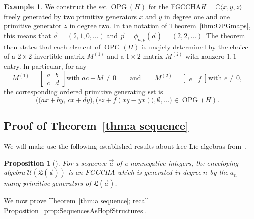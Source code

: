 \documentclass[11pt]{amsart}
\newtheorem{proposition}[theorem]{Proposition}
\theoremstyle{definition}
\newtheorem{example}[theorem]{Example}
\numberwithin{equation}{section}
\def\CC{{\mathbb C}}
\newcommand{\FGCCHA}{\textsf{FGCCHA}\xspace}
\newcommand{\OPG}{\operatorname{OPG}}
\begin{document}
\begin{example}
\label{ex:OPG}
We construct the set $\OPG(H)$ for the \FGCCHA $H = \CC\langle x, y, z\rangle$ freely generated by two primitive generators $x$ and $y$ in degree one and one primitive generator $z$ in degree two.  
In the notation of Theorem~\ref{thm:OPGmaps}, this means that $\vec{a} = (2, 1, 0, \ldots)$ and $\vec{p} = \phi_{a, p}(\vec{a}) = (2, 2, \ldots)$. 
The theorem then states that each element of $\OPG(H)$ is unqiely determined by the choice of a $2 \times 2$ invertible matrix $M^{(1)}$ and a $1 \times 2$ matrix $M^{(2)}$ with nonzero $1, 1$ entry.  
In particular, for any
\[
M^{(1)} = \begin{bmatrix}
a & b \\
c & d
\end{bmatrix}
\text{with $ac-bd \neq 0$}
\qquad\text{and}\qquad
M^{(2)} = \begin{bmatrix}
e & f
\end{bmatrix}
\text{with $e \neq 0$},
\]
the corresponding ordered primitive generating set is 
\[
\Big(\big(ax+by,\, cx+dy\big), \big(ez + f(xy-yx)\big), \emptyset, \ldots \Big) \in \OPG(H).
\]
\end{example}

\subsection{Proof of Theorem~\ref{thm:a sequence}}
\label{sec:classificationproof}

We will make use the following established results
about free Lie algebras from~\cite{Reutenauer-FreeLieAlgebras}.

\begin{proposition}[{\cite[Theorem 0.5]{Reutenauer-FreeLieAlgebras}}]
\label{prop:LieToFree}
For a sequence $\vec{a}$ of a nonnegative integers, the enveloping algebra $\mathcal{U}(\mathfrak{L}(\vec{a}))$ is an \FGCCHA which is generated in degree $n$ by the $a_{n}$-many primitive generators of $\mathfrak{L}(\vec{a})$.
\end{proposition}

We now prove Theorem~\ref{thm:a sequence}; recall Proposition~\ref{prop:SequencesAsHopfStructures}.
\end{document}
